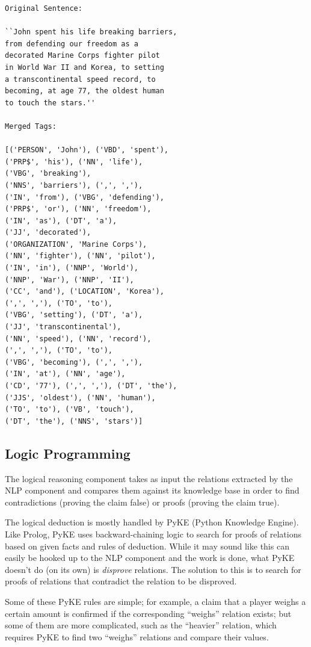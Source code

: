 \documentclass{chi2009}
\begin{document}
\begin{lstlisting}[caption=Merged Tags Example, label=lstMerge]
Original Sentence:

``John spent his life breaking barriers,
from defending our freedom as a 
decorated Marine Corps fighter pilot 
in World War II and Korea, to setting
a transcontinental speed record, to 
becoming, at age 77, the oldest human
to touch the stars.''

Merged Tags:

[('PERSON', 'John'), ('VBD', 'spent'),
('PRP$', 'his'), ('NN', 'life'), 
('VBG', 'breaking'), 
('NNS', 'barriers'), (',', ','), 
('IN', 'from'), ('VBG', 'defending'),
('PRP$', 'or'), ('NN', 'freedom'),
('IN', 'as'), ('DT', 'a'), 
('JJ', 'decorated'), 
('ORGANIZATION', 'Marine Corps'), 
('NN', 'fighter'), ('NN', 'pilot'), 
('IN', 'in'), ('NNP', 'World'), 
('NNP', 'War'), ('NNP', 'II'), 
('CC', 'and'), ('LOCATION', 'Korea'), 
(',', ','), ('TO', 'to'), 
('VBG', 'setting'), ('DT', 'a'), 
('JJ', 'transcontinental'), 
('NN', 'speed'), ('NN', 'record'), 
(',', ','), ('TO', 'to'), 
('VBG', 'becoming'), (',', ','), 
('IN', 'at'), ('NN', 'age'), 
('CD', '77'), (',', ','), ('DT', 'the'), 
('JJS', 'oldest'), ('NN', 'human'), 
('TO', 'to'), ('VB', 'touch'), 
('DT', 'the'), ('NNS', 'stars')]
\end{lstlisting}
 

\subsection{Logic Programming}

The logical reasoning component takes as input the relations extracted by the NLP component and compares them against its knowledge base in order to find contradictions (proving the claim false) or proofs (proving the claim true).

The logical deduction is mostly handled by PyKE (Python Knowledge Engine). \cite{PyKE} Like Prolog, PyKE uses backward-chaining logic to search for proofs of relations based on given facts and rules of deduction. While it may sound like this can easily be hooked up to the NLP component and the work is done, what PyKE doesn't do (on its own) is \textit{disprove} relations. The solution to this is to search for proofs of relations that contradict the relation to be disproved.

Some of these PyKE rules are simple;
for example, a claim that a player weighs a certain amount is confirmed if the corresponding ``weighs'' relation exists;
but some of them are more complicated, such as the ``heavier'' relation, which requires PyKE to find two ``weighs'' relations and compare their values.
\end{document}
